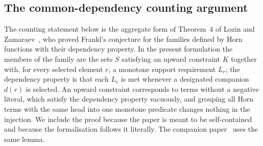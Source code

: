 \documentclass[11pt,a4paper]{article}
\theoremstyle{plain}
\theoremstyle{definition}
\theoremstyle{remark}
\begin{document}
\subsection{The common-dependency counting argument}\label{sec:count}

The counting statement below is the aggregate form of Theorem~4 of Lozin and Zamaraev~\cite{lozin2024union}, who proved Frankl's conjecture for the families defined by Horn functions with their dependency property. In the present formulation the members of the family are the sets $S$ satisfying an upward constraint $K$ together with, for every selected element $r$, a monotone support requirement $L_r$; the dependency property is that each $L_r$ is met whenever a designated companion $d(r)$ is selected. An upward constraint corresponds to terms without a negative literal, which satisfy the dependency property vacuously, and grouping all Horn terms with the same head into one monotone predicate changes nothing in the injection. We include the proof because the paper is meant to be self-contained and because the formalisation follows it literally. The companion paper~\cite{elementary2026} uses the same lemma.
\end{document}
